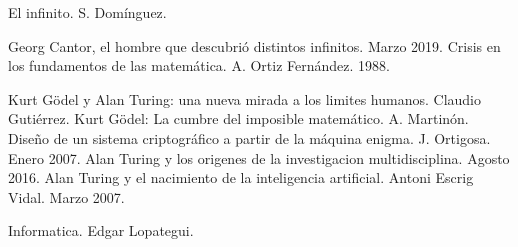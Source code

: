 \documentclass[letterpaper, 12 pt, conference]{ieeeconf}  %
\begin{document}
\begin{thebibliography}{99}

 El infinito. S. Domínguez.

Georg Cantor, el hombre que descubrió distintos infinitos. Marzo 2019.
Crisis en los fundamentos de las matemática. A. Ortiz Fernández. 1988.

Kurt Gödel y Alan Turing: una nueva mirada a los limites humanos. Claudio Gutiérrez.
 Kurt Gödel: La cumbre del imposible matemático. A. Martinón.
  Diseño de un sistema criptográfico
a partir de la máquina enigma. J. Ortigosa. Enero 2007.
  Alan Turing y los origenes de la investigacion multidisciplina. Agosto 2016.
Alan Turing y el nacimiento
de la inteligencia artificial. Antoni Escrig Vidal.
 Marzo 2007.

  Informatica. Edgar Lopategui.  






\end{thebibliography}
\end{document}
